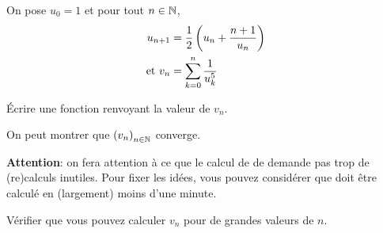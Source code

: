  On pose $u_{0} = 1$ et pour tout $n\in \mathbb{N}$,
\begin{align*}
  u_{n+1} &= \frac{1}{2}\left( u_{n}+\frac{n+1}{u_{n}}\right)\\
\text{et } v_{n} &= \sum_{k=0}^{n} \frac{1}{u_{k}^{5}}
\end{align*}

\question{} Écrire une fonction  renvoyant la valeur de
  $v_{n}$.

On peut montrer que $\left( v_{n}\right)_{n\in \mathbb{N}}$ converge.

\textbf{Attention}: on fera attention à ce que le calcul de 
de demande  pas trop de (re)calculs inutiles. Pour fixer les idées,
vous  pouvez considérer  que   doit être calculé  en
(largement) moins d'une minute.

\question{} Vérifier que vous pouvez calculer $v_{n}$ pour de grandes valeurs de $n$.

